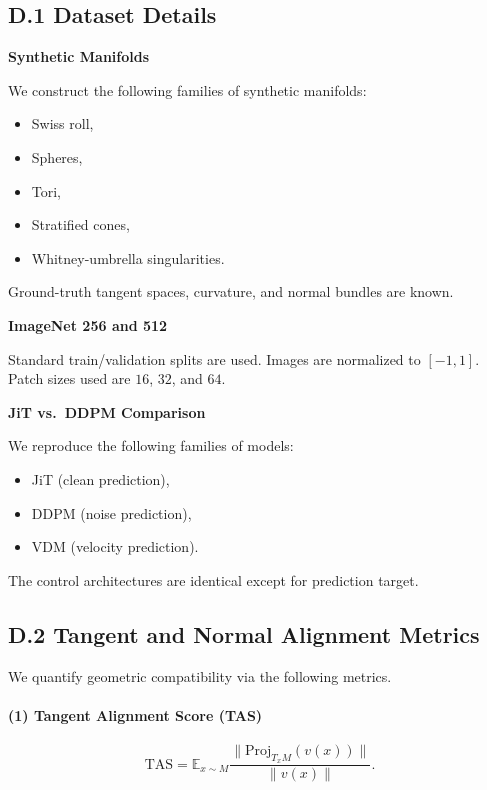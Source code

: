 \documentclass[11pt,a4paper,twocolumn]{article}
\begin{document}
\subsection*{D.1 Dataset Details}

\textbf{Synthetic Manifolds}

We construct the following families of synthetic manifolds:
\begin{itemize}
\item Swiss roll,
\item Spheres,
\item Tori,
\item Stratified cones,
\item Whitney-umbrella singularities.
\end{itemize}

Ground-truth tangent spaces, curvature, and normal bundles are known.

\textbf{ImageNet 256 and 512}

Standard train/validation splits are used.
Images are normalized to $[-1,1]$.
Patch sizes used are $16$, $32$, and $64$.

\textbf{JiT vs.\ DDPM Comparison}

We reproduce the following families of models:
\begin{itemize}
\item JiT (clean prediction),
\item DDPM (noise prediction),
\item VDM (velocity prediction).
\end{itemize}

The control architectures are identical except for prediction target.


\subsection*{D.2 Tangent and Normal Alignment Metrics}

We quantify geometric compatibility via the following metrics.

\paragraph{(1) Tangent Alignment Score (TAS)}
\[
\mathrm{TAS} =
\mathbb{E}_{x \sim M}
\frac{
\| \mathrm{Proj}_{T_xM}(v(x)) \|
}{
\|v(x)\|
}.
\]
\end{document}
